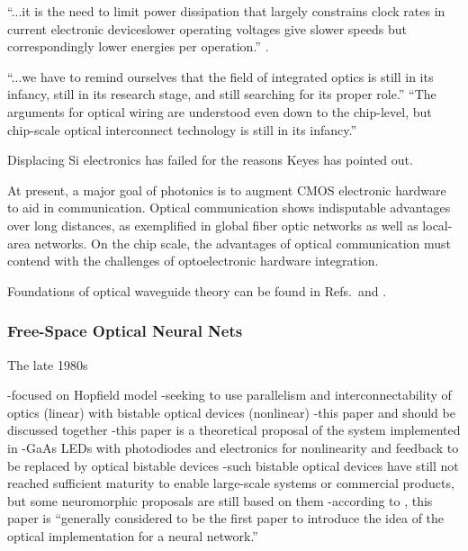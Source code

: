 \vspace{3em}
``...it is the need to limit power dissipation that largely constrains clock rates in current electronic devices\textemdash lower operating voltages give slower speeds but correspondingly lower energies per operation.'' \cite{mi2010}.

\vspace{3em}
``...we have to remind ourselves that the field of integrated optics is still in its infancy, still in its research stage, and still searching for its proper role.'' \cite{ko1981}
``The arguments for optical wiring are understood even down to the chip-level, but chip-scale optical interconnect technology is still in its infancy.'' \cite{mi2010}

Displacing Si electronics has failed for the reasons Keyes has pointed out.

At present, a major goal of photonics is to augment CMOS electronic hardware to aid in communication. Optical communication shows indisputable advantages over long distances, as exemplified in global fiber optic networks as well as local-area networks. On the chip scale, the advantages of optical communication must contend with the challenges of optoelectronic hardware integration. 

\vspace{3em}
Foundations of optical waveguide theory can be found in Refs.\,\cite{snlo1983} and \cite{hu2009}.

\subsubsection{Free-Space Optical Neural Nets}
The late 1980s 

\cite{psfa1985}
-focused on Hopfield model 
-seeking to use parallelism and interconnectability of optics (linear) with bistable optical devices (nonlinear)
-this paper and \cite{faps1985} should be discussed together
-this paper is a theoretical proposal of the system implemented in \cite{faps1985}
-GaAs LEDs with photodiodes and electronics for nonlinearity and feedback to be replaced by optical bistable devices
-such bistable optical devices have still not reached sufficient maturity to enable large-scale systems or commercial products, but some neuromorphic proposals are still based on them
-according to \cite{juyu1996}, this paper is ``generally considered to be the first paper to introduce the idea of the optical implementation for a neural network.'' \cite{juyu1996}

